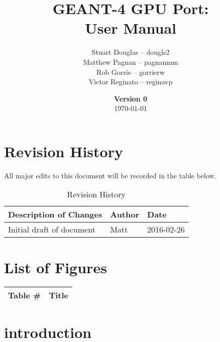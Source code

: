 \documentclass[12pt]{article}
\title{
\LARGE GEANT-4 GPU Port:
\\\vspace{10mm}
\large \textbf{User Manual}
\vspace{40mm}
}
\author{
Stuart Douglas -- dougls2
\\Matthew Pagnan -- pagnanmm
\\Rob Gorrie -- gorrierw
\\Victor Reginato -- reginavp
\vspace{10mm}
}
\date{\vfill \textbf{Version 0}\\ \today}
\begin{document}

\maketitle
\newpage

\tableofcontents
\newpage
{}
\restoregeometry


\section{Revision History}
All major edits to this document will be recorded in the table below.

\begin{table}[h]
\centering
\caption{Revision History}\label{Table_Revision}
\begin{tabular}{lll}

\toprule
\bf Description of Changes & \bf Author & \bf Date\\\midrule
Initial draft of document & Matt & 2016-02-26\\

\bottomrule
\end{tabular}
\end{table}

\section{List of Figures}

\begin{center}
\begin{tabular}{cl}
\toprule

\bf Table \# & \bf Title\\\midrule

\bottomrule
\end{tabular}
\end{center}


\section{introduction}				%
\end{document}
